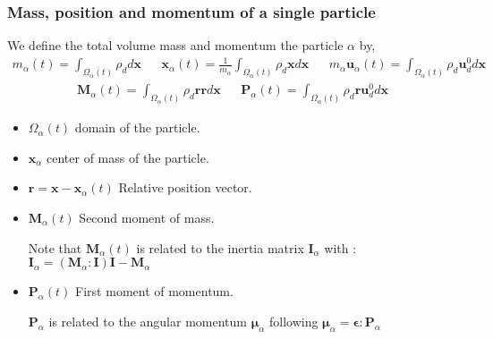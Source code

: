 \documentclass{sintefbeamer}
\begin{document}
\begin{frame}
  \frametitle{Mass, position and momentum of a single particle}


  We define the total volume mass and momentum the particle $\alpha$ by, 
  \begin{align*}
    m_\alpha(t)
    = \int_{\Omega_\alpha(t)} \rho_d d\textbf{x}
    &&
    \textbf{x}_\alpha(t)
    = \frac{1}{m_\alpha}\int_{\Omega_\alpha(t)} \rho_d \textbf{x} d\textbf{x}
    &&
    m_\alpha \textbf{u}_\alpha(t) 
    = \int_{\Omega_\alpha(t)} \rho_d \textbf{u}_d^0 d\textbf{x}
  \end{align*}
  \begin{align*}
    \textbf{M}_\alpha(t) 
    = \int_{\Omega_\alpha(t)} \rho_d \textbf{rr} d\textbf{x} &&
    \textbf{P}_\alpha(t) 
    = \int_{\Omega_\alpha(t)} \rho_d \textbf{r} \textbf{u}_d^0 d\textbf{x}
  \end{align*}
  \begin{definition}
    \begin{itemize}
      \item $ \Omega_\alpha(t)$ domain of the particle. 
      \item $ \textbf{x}_\alpha $ center of mass of the particle. 
      \item $\textbf{r} = \textbf{x} - \textbf{x}_\alpha(t)$ Relative position vector. 
      \item $\textbf{M}_\alpha(t)$ Second moment of mass. 
      
      Note that $\textbf{M}_\alpha(t)$ is related to the inertia matrix $\textbf{I}_\alpha$ with : $\textbf{I}_\alpha = (\textbf{M}_\alpha : \textbf{I} )\textbf{I}- \textbf{M}_\alpha$
      \item $\textbf{P}_\alpha(t)$ First moment of momentum. 
      
      $\textbf{P}_\alpha$ is related to the angular momentum $\bm\mu_\alpha$ following $\bm\mu_\alpha =\bm\epsilon : \textbf{P}_\alpha$
    \end{itemize}
  \end{definition}

\end{frame}
\end{document}
